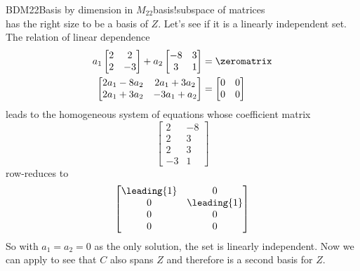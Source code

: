 \begin{example}{BDM22}{Basis by dimension in $M_{22}$}{basis!subspace of matrices}
\begin{equation*}
{}
\end{equation*}
%
has the right size to be a basis of $Z$.  Let's see if it is a linearly independent set.  The relation of linear dependence
%
\begin{align*}
a_1\begin{bmatrix}2&2\\2&-3\end{bmatrix}+
a_2\begin{bmatrix}-8&3\\3&1\end{bmatrix}&=\zeromatrix\\
\begin{bmatrix}2a_1-8a_2&2a_1+3a_2\\2a_1+3a_2&-3a_1+a_2\end{bmatrix}&=
\begin{bmatrix}0&0\\0&0\end{bmatrix}
\end{align*}
%
leads to the homogeneous system of equations whose coefficient matrix
%
\begin{equation*}
\begin{bmatrix}
2&-8\\
2&3\\
2&3\\
-3&1
\end{bmatrix}
\end{equation*}
%
row-reduces to
%
\begin{equation*}
\begin{bmatrix}
\leading{1}&0\\
0&\leading{1}\\
0&0\\
0&0
\end{bmatrix}
\end{equation*}
%
So with $a_1=a_2=0$ as the only solution, the set is linearly independent.  Now we can apply  to see that $C$ also spans $Z$ and therefore is a second basis for $Z$.
%
\end{example}
%
%
